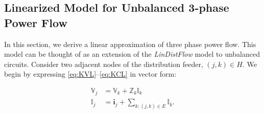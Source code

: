 \subsection{Linearized Model for Unbalanced 3-phase Power Flow}

\setlength{\abovedisplayskip}{-5pt}
\setlength{\belowdisplayskip}{-0pt}

In this section, we derive a linear approximation of three phase power flow.  This model can be thought of as an extension of the \emph{LinDistFlow} model to unbalanced circuits.  Consider two adjacent nodes of the distribution feeder, $(j,k) \in H$.  We begin by expressing \eqref{eq:KVL}--\eqref{eq:KCL} in vector form:

\begin{align}
	\mathbb{V}_{j} &= \mathbb{V}_{k} + \mathbb{Z}_{k} \mathbb{I}_{k} \label{eq:KVL_compact} \\
    \mathbb{I}_{j} &=  \mathbf{i}_{j}+ \sum_{k:(j,k)\in E}\mathbb{I}_{k} \label{eq:KCL_compact}.
\end{align}



